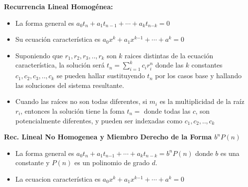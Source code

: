 \textbf{Recurrencia Lineal Homog\'enea:}
\begin{itemize}
    \item{
		La forma general es $a_0 t_n+ a_1t_{n {−} 1} + \cdots + a_k t_{{n} {− k}} = 0$
    }
    \item{
		Su ecuaci\'on caracter\'istica es $a_0 x^k +a_1 x^{{k}{−1}} + \cdots + a^k = 0$
    }
    \item{
		 Suponiendo que $r_1, r_2, r_3, ..,r_k$ son $k$ raices distintas de la ecuaci\'on 
		 caracter\'istica, la soluci\'on ser\'a $t_n = \sum_{i=1}^{k} c_i r^n_i$ donde las $k$ constantes
		 $c_1, c_2, c_3, .., c_k$ se pueden hallar sustituyendo $t_n$ por los casos base y 
		 hallando las soluciones del sistema resultante.
    }
    \item{
		 Cuando las ra\'ices no son todas diferentes, si $m_i$ es la multiplicidad de la ra\'iz $r_i$, 
		 entonces la soluci\'on tiene la foma $t_n=$ %
		donde todas las $c$, son potencialmente diferentes, y pueden ser indexadas como $c_1, c_2, .., c_k$
    }
    
\end{itemize}

\textbf{Rec. Lineal No Homogenea y Miembro Derecho de la Forma $b^n P(n)$}
\begin{itemize}
	\item{
		 La forma general es  $a_0 t_n + a_1 t_{n {−1}} + \cdots + a_k t_{n − k} = b^n P(n)$ donde $b$ es una 
		 constante y $P(n)$ es un polinomio de grado $d$.
	}
	\item{
		La ecuacion caracter\'istica es $a_0 x^k + a_1 x^{k {−1}} + \cdots + a^k = 0$
	}
\end{itemize}
